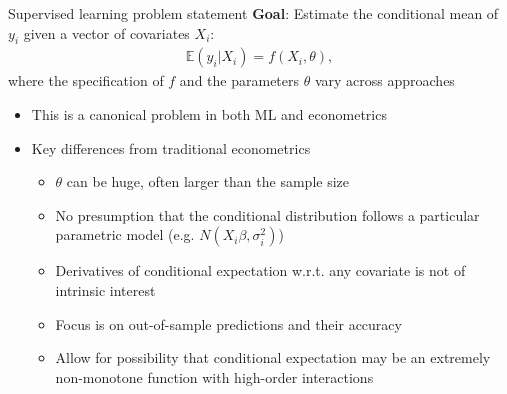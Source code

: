 \documentclass[xcolor=table, aspectratio=169]{beamer}
\newcommand{\alertbf}[1]{\alert{\textbf{#1}}}
\newcommand{\E}{\mathbb{E}}
\begin{document}
\begin{frame}{Supervised learning problem statement}
\alertbf{Goal}: Estimate the conditional mean of $y_i$ given a vector of covariates $X_i$:
\begin{align*}
    \E( y_i | X_i) = f(X_i,\theta),
\end{align*}
where the specification of $f$ and the parameters $\theta$ vary across approaches
    \begin{itemize}
        \item This is a canonical problem in both ML and econometrics
        \item Key differences from traditional econometrics
        \begin{itemize}
            \item $\theta$ can be huge, often larger than the sample size
            \item No presumption that the conditional distribution follows a particular parametric model (e.g. $N(X_i\beta,\sigma_i^2)$)
            \item Derivatives of conditional expectation w.r.t. any covariate is not of intrinsic interest
            \item Focus is on out-of-sample predictions and their accuracy
            \item Allow for possibility that conditional expectation may be an extremely non-monotone function with high-order interactions
        \end{itemize}
    \end{itemize}
\end{frame}
\end{document}
